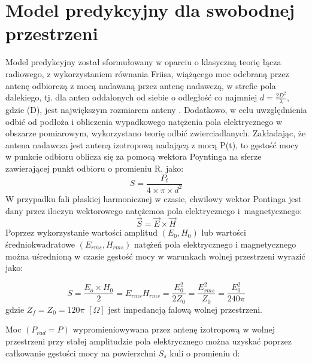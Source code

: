 \section[Model predykcyjny dla swobodnej \ldots]{Model predykcyjny dla swobodnej przestrzeni}
\label{sec:17_mp_sw}
Model predykcyjny został sformułowany w oparciu o klasyczną teorię łącza radiowego, z wykorzystaniem równania Friisa, wiążącego moc odebraną przez antenę odbiorczą z mocą nadawaną przez antenę nadawczą, w strefie pola dalekiego, tj. dla anten oddalonych od siebie o odległość co najmniej  $d=\frac{2D^{2}}{\lambda}$, gdzie (D), jest największym rozmiarem anteny \cite{16CONSTANTINE16}. Dodatkowo, w celu uwzględnienia odbić od podłoża i obliczenia wypadkowego natężenia pola elektrycznego w obszarze pomiarowym, wykorzystano teorię odbić zwierciadlanych.
Zakładając, że antena nadawcza jest anteną izotropową nadającą z mocą P(t), to gęstość mocy w punkcie odbioru oblicza się za pomocą wektora Poyntinga na sferze zawierającej punkt odbioru o promieniu R, jako:
\begin{equation} \label{eq:17_1}
    S=\frac{P_{t}}{4\times \pi \times d^{2}} 
\end{equation}
W przypadku fali płaskiej harmonicznej w czasie, chwilowy wektor Pontinga jest dany przez iloczyn wektorowego natężemoa pola elektrycznego i~magnetycznego:
\begin{equation} \label{eq:17_2}
    \vec{S}=\vec{E}\times \vec{H}
\end{equation}
Poprzez wykorzystanie wartości amplitud $(E_{0}  ,H_{0}) $ lub wartości średniokwadratowe $(E_{rms}  ,H_{rms})$ natężeń pola elektrycznego i magnetycznego można uśrednioną w czasie gęstość mocy w warunkach wolnej przestrzeni  wyrazić jako:

\begin{equation} \label{eq:17_3}
    S=\frac{E_{o}\times H_{0}}{2}=E_{rms}H_{rms}=\frac{E_{0}^{2}}{2Z_{0}}=\frac{E_{rms}^{2}}{Z_{0}}=\frac{E_{0}^{2}}{240 \pi}
\end{equation}
gdzie $Z_{f}=Z_{0}=120 \pi $ $[\Omega]$ jest impedancją falową wolnej przestrzeni.

Moc $(P_{rad} = P)$ wypromieniowywana przez antenę izotropową w wolnej przestrzeni przy stałej amplitudzie pola elektrycznego można uzyskać poprzez całkowanie gęstości mocy na powierzchni $S_s$ kuli o promieniu d: 

